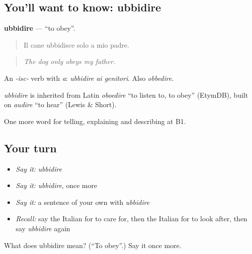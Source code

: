 \subsection*{You'll want to know: ubbidire}
\textbf{ubbidire} — \textquotedblleft{}to obey\textquotedblright{}.

\begin{quote}
Il cane ubbidisce solo a mio padre.
\end{quote}

\begin{quote}
\emph{The dog only obeys my father.}
\end{quote}

An \emph{-isc-} verb with \emph{a}: \emph{ubbidire ai genitori}. Also \emph{obbedire}.

\begin{cousinweb}
\emph{ubbidire} is inherited from Latin \emph{oboedīre} \textquotedblleft{}to listen to, to obey\textquotedblright{} (EtymDB), built on \emph{audīre} \textquotedblleft{}to hear\textquotedblright{} (Lewis \& Short).
\end{cousinweb}

\begin{grammarlens}[title={What you've built}]
One more word for telling, explaining and describing at B1.
\end{grammarlens}

\subsection*{Your turn}
\begin{itemize}
\raggedright
  \item \emph{Say it:} \emph{ubbidire}
  \item \emph{Say it:} \emph{ubbidire}, once more
  \item \emph{Say it:} a sentence of your own with \emph{ubbidire}
  \item \emph{Recall:} say the Italian for to care for, then the Italian for to look after, then say \emph{ubbidire} again
\end{itemize}

\begin{tcolorbox}[breakable,colback=teal!4,colframe=teal!35!black,title={Before you move on}]
What does ubbidire mean? (\textquotedblleft{}To obey\textquotedblright{}.) Say it once more.
\end{tcolorbox}

